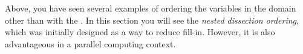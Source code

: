 

Above, you have seen several examples of ordering the variables in the
domain other than with the . In this
section you will see the \emph{nested dissection ordering}, which was
initially designed as a way to reduce fill-in. However, it is also
advantageous in a parallel computing context.

